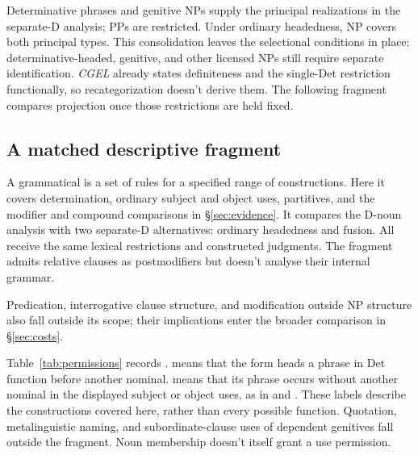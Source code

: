 \documentclass[12pt]{article}
\begin{document}
Determinative phrases and genitive NPs supply the principal realizations in the separate-D analysis; PPs are restricted. Under ordinary headedness, NP covers both principal types. This consolidation leaves the selectional conditions in place: determinative-headed, genitive, and other licensed NPs still require separate identification. \textit{CGEL} already states definiteness and the single-Det restriction functionally, so recategorization doesn't derive them. The following fragment compares projection once those restrictions are held fixed.

\subsection{A matched descriptive fragment}\label{sec:fragment}

A grammatical  is a set of rules for a specified range of constructions. Here it covers determination, ordinary subject and object uses, partitives, and the modifier and compound comparisons in §\ref{sec:evidence}. It compares the D-noun analysis with two separate-D alternatives: ordinary headedness and fusion. All receive the same lexical restrictions and constructed judgments. The fragment admits relative clauses as postmodifiers but doesn't analyse their internal grammar.

Predication, interrogative clause structure, and modification outside NP structure also fall outside its scope; their implications enter the broader comparison in §\ref{sec:costs}.

Table~\ref{tab:permissions} records .  means that the form heads a phrase in Det function before another nominal.  means that its phrase occurs without another nominal in the displayed subject or object uses, as in  and . These labels describe the constructions covered here, rather than every possible function. Quotation, metalinguistic naming, and subordinate-clause uses of dependent genitives fall outside the fragment. Noun membership doesn't itself grant a use permission.
\end{document}
